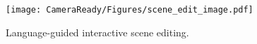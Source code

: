\begin{figure}[t]
\centering
\texttt{[image: CameraReady/Figures/scene\_edit\_image.pdf]}
\caption{Language-guided interactive scene editing.}
\label{scene_editing}
\end{figure}